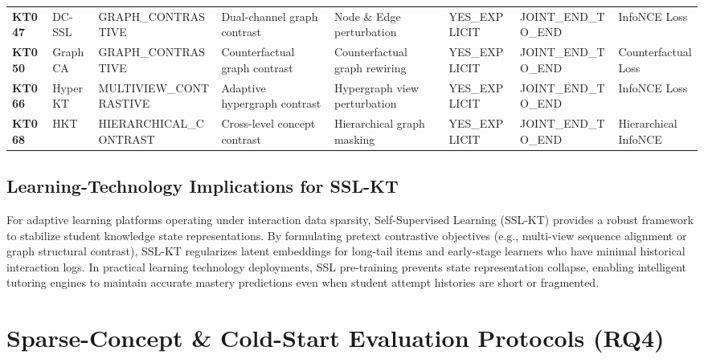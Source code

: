 \documentclass[journal]{IEEEtran}
\begin{document}
\begin{table}[t]
{\begin{tabular}{llllllll}
\textbf{KT047} & DC-SSL \cite{KT047_DCSSL_2023} & GRAPH\_CONTRASTIVE & Dual-channel graph contrast & Node \& Edge perturbation & YES\_EXPLICIT & JOINT\_END\_TO\_END & InfoNCE Loss \\
\textbf{KT050} & GraphCA \cite{KT050_GraphCA_2023} & GRAPH\_CONTRASTIVE & Counterfactual graph contrast & Counterfactual graph rewiring & YES\_EXPLICIT & JOINT\_END\_TO\_END & Counterfactual Loss \\
\textbf{KT066} & HyperKT \cite{KT066_HyperKT_2025} & MULTIVIEW\_CONTRASTIVE & Adaptive hypergraph contrast & Hypergraph view perturbation & YES\_EXPLICIT & JOINT\_END\_TO\_END & InfoNCE Loss \\
\textbf{KT068} & HKT \cite{KT068_HKT_2025} & HIERARCHICAL\_CONTRAST & Cross-level concept contrast & Hierarchical graph masking & YES\_EXPLICIT & JOINT\_END\_TO\_END & Hierarchical InfoNCE \\
\bottomrule
\end{tabular}
}
\end{table}

\subsection{Learning-Technology Implications for SSL-KT}
For adaptive learning platforms operating under interaction data sparsity, Self-Supervised Learning (SSL-KT) provides a robust framework to stabilize student knowledge state representations. By formulating pretext contrastive objectives (e.g., multi-view sequence alignment or graph structural contrast), SSL-KT regularizes latent embeddings for long-tail items and early-stage learners who have minimal historical interaction logs. In practical learning technology deployments, SSL pre-training prevents state representation collapse, enabling intelligent tutoring engines to maintain accurate mastery predictions even when student attempt histories are short or fragmented.

\section{Sparse-Concept \& Cold-Start Evaluation Protocols (RQ4)}
\label{sec:sparse_coldstart}
\end{document}
